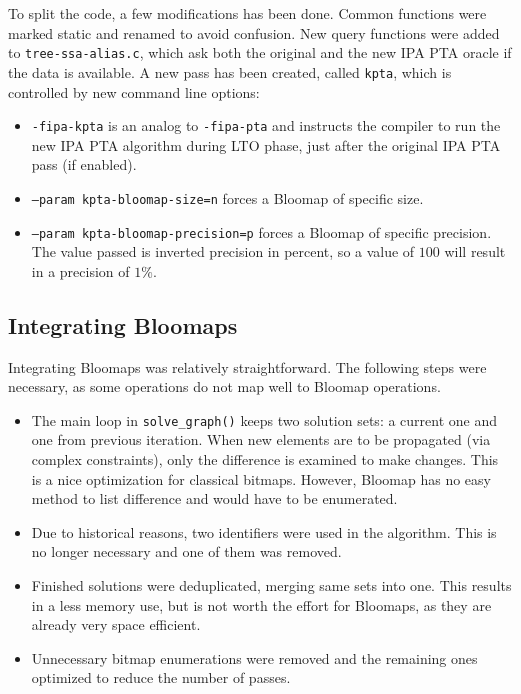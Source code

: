 To split the code, a few modifications has been done. Common functions were
marked static and renamed to avoid confusion. New query functions were added to
{\tt tree-ssa-alias.c}, which ask both the original and the new IPA PTA oracle
if the data is available. A new pass has been created, called {\tt kpta}, which
is controlled by new command line options:

\begin{itemize}
	\item {\tt -fipa-kpta} is an analog to {\tt -fipa-pta} and instructs the compiler to run the new IPA PTA algorithm during LTO phase, just after the original IPA PTA pass (if enabled).
	\item {\tt --param kpta-bloomap-size=n} forces a Bloomap of specific size.
	\item {\tt --param kpta-bloomap-precision=p} forces a Bloomap of specific precision. The value passed is inverted precision in percent, so a value of $100$ will result in a precision of $1\%$.
\end{itemize}


\subsection{Integrating Bloomaps}

Integrating Bloomaps was relatively straightforward. The following steps were necessary, as some operations do not map well to Bloomap operations.

\begin{itemize}
	\item The main loop in {\tt solve\_graph()} keeps two solution sets: a
		current one and one from previous iteration. When new elements are to
		be propagated (via complex constraints), only the difference is
		examined to make changes. This is a nice optimization for classical
		bitmaps. However, Bloomap has no easy method to list difference and
		would have to be enumerated. 
	\item Due to historical reasons, two identifiers were used in the
		algorithm. This is no longer necessary and one of them was removed.
	\item Finished solutions were deduplicated, merging same sets into one. This
		results in a less memory use, but is not worth the effort
		for Bloomaps, as they are already very space efficient.
	\item Unnecessary bitmap enumerations were removed and the remaining ones
		optimized to reduce the number of passes.
\end{itemize}

